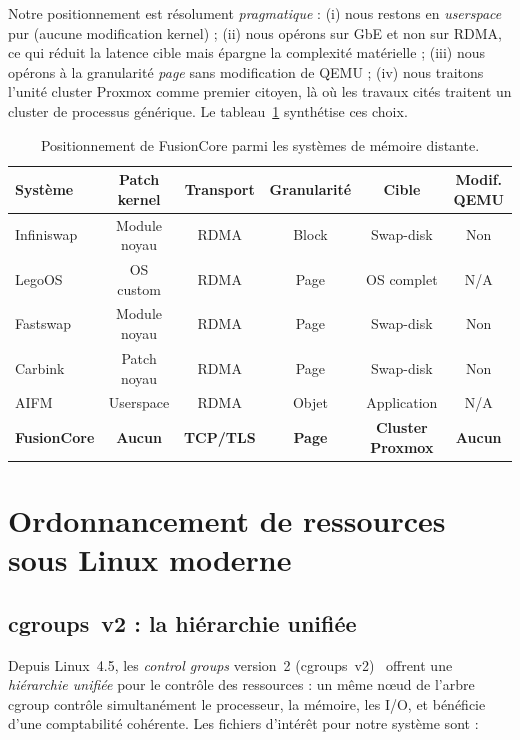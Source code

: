 Notre positionnement est résolument \emph{pragmatique} : (i) nous restons en \emph{userspace} pur (aucune modification kernel) ; (ii) nous opérons sur GbE et non sur RDMA, ce qui réduit la latence cible mais épargne la complexité matérielle ; (iii) nous opérons à la granularité \emph{page} sans modification de QEMU ; (iv) nous traitons l'unité \og{}cluster Proxmox\fg{} comme premier citoyen, là où les travaux cités traitent un \og{}cluster de processus\fg{} générique. Le tableau~\ref{tab:cmp-rm} synthétise ces choix.

\begin{table}[H]
\centering
\small
\caption{Positionnement de FusionCore parmi les systèmes de mémoire distante.}
\begin{tabular}{lccccc}
\toprule
\textbf{Système} & \textbf{Patch kernel} & \textbf{Transport} & \textbf{Granularité} & \textbf{Cible} & \textbf{Modif. QEMU} \\
\midrule
Infiniswap   & Module noyau & RDMA & Block & Swap-disk     & Non \\
LegoOS       & OS custom    & RDMA & Page  & OS complet    & N/A \\
Fastswap     & Module noyau & RDMA & Page  & Swap-disk     & Non \\
Carbink      & Patch noyau  & RDMA & Page  & Swap-disk     & Non \\
AIFM         & Userspace    & RDMA & Objet & Application   & N/A \\
\textbf{FusionCore} & \textbf{Aucun} & \textbf{TCP/TLS} & \textbf{Page} & \textbf{Cluster Proxmox} & \textbf{Aucun} \\
\bottomrule
\end{tabular}

\label{tab:cmp-rm}
\end{table}

\section{Ordonnancement de ressources sous Linux moderne}
\label{sec:cgroups-psi}

\subsection{cgroups~v2 : la hiérarchie unifiée}

Depuis Linux~4.5, les \emph{control groups} version~2 (cgroups~v2)~\cite{cgroups_v2_doc} offrent une \emph{hiérarchie unifiée} pour le contrôle des ressources : un même nœud de l'arbre cgroup contrôle simultanément le processeur, la mémoire, les I/O, et bénéficie d'une comptabilité cohérente. Les fichiers d'intérêt pour notre système sont :

